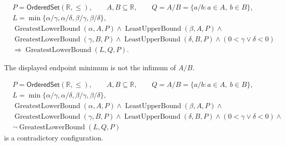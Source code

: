 \begin{remark*}
\[
\begin{aligned}
&P=\mathsf{OrderedSet}(\mathbb{R},\leq),\qquad
A,B\subseteq\mathbb{R},\qquad Q=A/B=\{a/b:a\in A,\ b\in B\},\\
&L=\min\{\alpha/\gamma,\alpha/\delta,\beta/\gamma,\beta/\delta\},\\
&\operatorname{GreatestLowerBound}(\alpha,A,P)\land
\operatorname{LeastUpperBound}(\beta,A,P)\land\\
&\operatorname{GreatestLowerBound}(\gamma,B,P)\land
\operatorname{LeastUpperBound}(\delta,B,P)\land
(0<\gamma\lor\delta<0)\\
&\Longrightarrow \operatorname{GreatestLowerBound}(L,Q,P).
\end{aligned}
\]
\end{remark*}

\begin{remark*}
The displayed endpoint minimum is not the infimum of $A/B$.
\end{remark*}

\begin{remark*}
\[
\begin{aligned}
&P=\mathsf{OrderedSet}(\mathbb{R},\leq),\qquad
A,B\subseteq\mathbb{R},\qquad Q=A/B=\{a/b:a\in A,\ b\in B\},\\
&L=\min\{\alpha/\gamma,\alpha/\delta,\beta/\gamma,\beta/\delta\},\\
&\operatorname{GreatestLowerBound}(\alpha,A,P)\land
\operatorname{LeastUpperBound}(\beta,A,P)\land\\
&\operatorname{GreatestLowerBound}(\gamma,B,P)\land
\operatorname{LeastUpperBound}(\delta,B,P)\land
(0<\gamma\lor\delta<0)\land\\
&\neg\operatorname{GreatestLowerBound}(L,Q,P)
\end{aligned}
\]
is a contradictory configuration.
\end{remark*}

